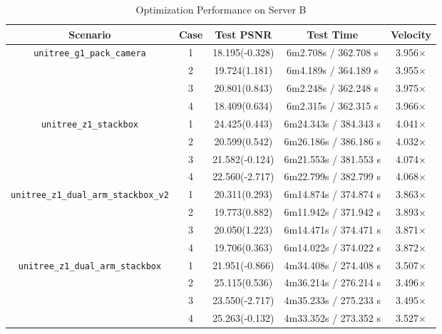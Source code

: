 \begin{table}[htbp]
    \centering
    \small %
    \renewcommand{\arraystretch}{1.2} %
    \setlength{\arrayrulewidth}{0.8pt} %
    \caption{Optimization Performance on Server B}
    \label{tab:optimized_performance_b}
    
    \begin{tabular}{|c|c|c|c|c|}
        \hline
        \rowcolor{yellow} \textbf{Scenario} & \textbf{Case} & \textbf{Test PSNR} & \textbf{Test Time} & \textbf{Velocity} \\ \hline
        
        \multirow{4}{*}{\texttt{unitree\_g1\_pack\_camera}} 
        & 1 & 18.195(-0.328) & 6m2.708s / 362.708 s & 3.956$\times$ \\ \cline{2-5}
        & 2 & 19.724(1.181) & 6m4.189s / 364.189 s & 3.955$\times$ \\ \cline{2-5}
        & 3 & 20.801(0.843) & 6m2.248s / 362.248 s & 3.975$\times$ \\ \cline{2-5}
        & 4 & 18.409(0.634) & 6m2.315s / 362.315 s & 3.966$\times$ \\ \hline
        
        \multirow{4}{*}{\texttt{unitree\_z1\_stackbox}} 
        & 1 & 24.425(0.443) & 6m24.343s / 384.343 s & 4.041$\times$ \\ \cline{2-5}
        & 2 & 20.599(0.542) & 6m26.186s / 386.186 s & 4.032$\times$ \\ \cline{2-5}
        & 3 & 21.582(-0.124) & 6m21.553s / 381.553 s & 4.074$\times$ \\ \cline{2-5}
        & 4 & 22.560(-2.717)& 6m22.799s / 382.799 s & 4.068$\times$ \\ \hline
        
        \multirow{4}{*}{\texttt{unitree\_z1\_dual\_arm\_stackbox\_v2}} 
        & 1 & 20.311(0.293) & 6m14.874s / 374.874 s & 3.863$\times$ \\ \cline{2-5}
        & 2 & 19.773(0.882) & 6m11.942s / 371.942 s & 3.893$\times$ \\ \cline{2-5}
        & 3 & 20.050(1.223)& 6m14.471s / 374.471 s & 3.871$\times$ \\ \cline{2-5}
        & 4 & 19.706(0.363) & 6m14.022s / 374.022 s & 3.872$\times$ \\ \hline
        
        \multirow{4}{*}{\texttt{unitree\_z1\_dual\_arm\_stackbox}} 
        & 1 & 21.951(-0.866) & 4m34.408s / 274.408 s & 3.507$\times$ \\ \cline{2-5}
        & 2 & 25.115(0.536) & 4m36.214s / 276.214 s & 3.496$\times$ \\ \cline{2-5}
        & 3 & 23.550(-2.717) & 4m35.233s / 275.233 s & 3.495$\times$ \\ \cline{2-5}
        & 4 & 25.263(-0.132) & 4m33.352s / 273.352 s & 3.527$\times$ \\ \hline
        

\end{tabular}
\end{table}
